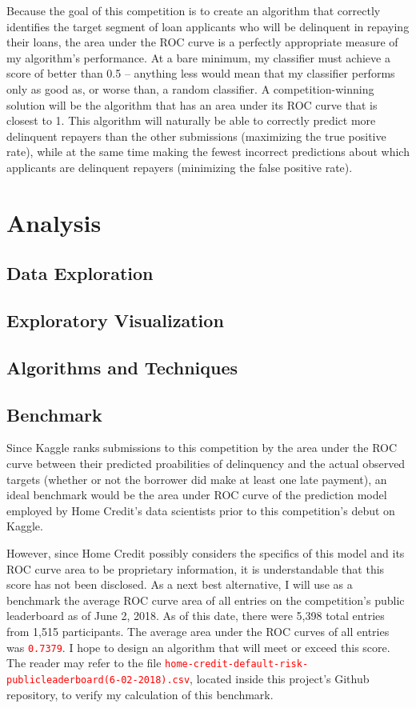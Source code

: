 \documentclass[12pt, letterpaper]{article}
\begin{document}
Because the goal of this competition is to create an algorithm that correctly identifies the target segment of loan applicants who will be delinquent in repaying their loans, the area under the ROC curve is a perfectly appropriate measure of my algorithm's performance. At a bare minimum, my classifier must achieve a score of better than 0.5 -- anything less would mean that my classifier performs only as good as, or worse than, a random classifier. A competition-winning solution will be the algorithm that has an area under its ROC curve that is closest to 1. This algorithm will naturally be able to correctly predict more delinquent repayers than the other submissions (maximizing the true positive rate), while at the same time making the fewest incorrect predictions about which applicants are delinquent repayers (minimizing the false positive rate).

\section{Analysis}
\subsection{Data Exploration}


\subsection{Exploratory Visualization}
\subsection{Algorithms and Techniques}
\subsection{Benchmark}
Since Kaggle ranks submissions to this competition by the area under the ROC curve between their predicted proabilities of delinquency and the actual observed targets (whether or not the borrower did make at least one late payment), an ideal benchmark would be the area under ROC curve of the prediction model employed by Home Credit's data scientists prior to this competition's debut on Kaggle.

However, since Home Credit possibly considers the specifics of this model and its ROC curve area to be proprietary information, it is understandable that this score has not been disclosed. As a next best alternative, I will use as a benchmark the average ROC curve area of all entries on the competition's public leaderboard\cite{kagglehomecreditcompetitionpublicleaderboard} as of June 2, 2018. As of this date, there were 5,398 total entries from 1,515 participants. The average area under the ROC curves of all entries was \colorbox{backcolor}{\textcolor{red}{\texttt{0.7379}}}. I hope to design an algorithm that will meet or exceed this score. The reader may refer to the file \colorbox{backcolor}{\textcolor{red}{\texttt{home-credit-default-risk-publicleaderboard(6-02-2018).csv}}}, located inside this project's Github repository\cite{githubprojectrepo}, to verify my calculation of this benchmark.
\end{document}
